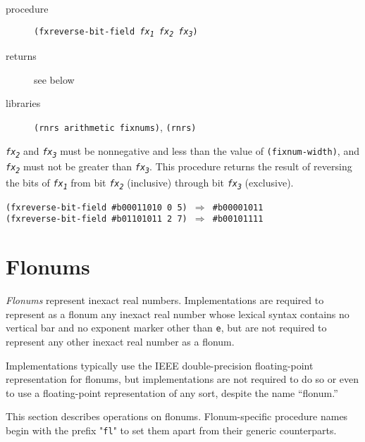 \begin{description}

\label{objects_s175}\item[procedure] \texttt{(fxreverse-bit-field \textit{fx\textsubscript{1}} \textit{fx\textsubscript{2}} \textit{fx\textsubscript{3}})}



\item[returns] see below


\item[libraries] \texttt{(rnrs arithmetic fixnums)}, \texttt{(rnrs)}
\end{description}

\texttt{\textit{fx\textsubscript{2}}} and \texttt{\textit{fx\textsubscript{3}}} must be nonnegative and less than
the value of \texttt{(fixnum-width)}, and \texttt{\textit{fx\textsubscript{2}}} must not be greater
than \texttt{\textit{fx\textsubscript{3}}}.
This procedure returns the result of reversing the bits of
\texttt{\textit{fx\textsubscript{1}}} from bit \texttt{\textit{fx\textsubscript{2}}} (inclusive) through bit \texttt{\textit{fx\textsubscript{3}}} (exclusive).

\begin{alltt}
(fxreverse-bit-field \#{}b00011010 0 5) \(\Rightarrow\) \#{}b00001011
(fxreverse-bit-field \#{}b01101011 2 7) \(\Rightarrow\) \#{}b00101111
\end{alltt}

\section{\label{objects_g112}\label{objects_h6}Flonums\label{objects_SECTFLONUMS}}



\label{objects_s176}\textit{Flonums} represent inexact real numbers.
Implementations are required to represent as a flonum any inexact
real number whose lexical syntax contains no vertical bar and
no exponent marker other than \texttt{e}, but are not required
to represent any other inexact real number as a flonum.


Implementations typically use the IEEE double-precision
floating-point representation for flonums, but implementations are not
required to do so or even to use a floating-point representation
of any sort, despite the name ``flonum.''


This section describes operations on flonums.
Flonum-specific procedure names begin with the prefix "\texttt{fl}" to
set them apart from their generic counterparts.


